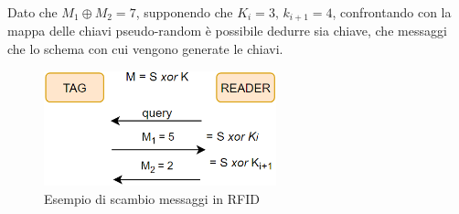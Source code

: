 \begin{example}[ RFID:]
Dato che $M_1\oplus{M_2}=7$, supponendo che $K_i=3,\,k_{i+1}=4$, confrontando con la mappa delle chiavi pseudo-random è possibile dedurre sia chiave, che messaggi che lo schema con cui vengono generate le chiavi.
\begin{figure}[h]
    \centering
    \includegraphics[width=0.6\textwidth]{image/rfid_example.png}
    \caption{Esempio di scambio messaggi in RFID}
    \label{fig:rfid_example}
\end{figure}

\end{example}\pagebreak
